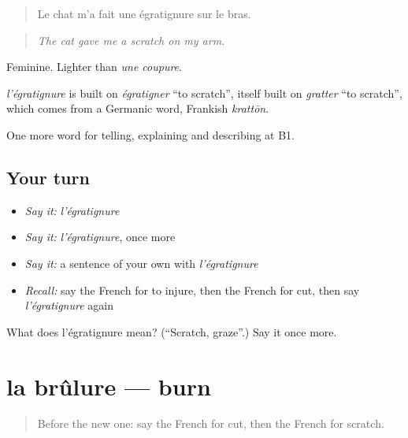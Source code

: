 \begin{quote}
Le chat m'a fait une égratignure sur le bras.
\end{quote}

\begin{quote}
\emph{The cat gave me a scratch on my arm.}
\end{quote}

Feminine. Lighter than \emph{une coupure}.

\begin{cousinweb}
\emph{l'égratignure} is built on \emph{égratigner} \textquotedblleft{}to scratch\textquotedblright{}, itself built on \emph{gratter} \textquotedblleft{}to scratch\textquotedblright{}, which comes from a Germanic word, Frankish \emph{krattōn}.
\end{cousinweb}

\begin{grammarlens}[title={What you've built}]
One more word for telling, explaining and describing at B1.
\end{grammarlens}

\subsection*{Your turn}
\begin{itemize}
\raggedright
  \item \emph{Say it:} \emph{l'égratignure}
  \item \emph{Say it:} \emph{l'égratignure}, once more
  \item \emph{Say it:} a sentence of your own with \emph{l'égratignure}
  \item \emph{Recall:} say the French for to injure, then the French for cut, then say \emph{l'égratignure} again
\end{itemize}

\begin{tcolorbox}[breakable,colback=teal!4,colframe=teal!35!black,title={Before you move on}]
What does l'égratignure mean? (\textquotedblleft{}Scratch, graze\textquotedblright{}.) Say it once more.
\end{tcolorbox}
\section[la brûlure]{la brûlure — burn}

\label{lesson:FR-C479-brulure}



\begin{quote}
Before the new one: say the French for cut, then the French for scratch.
\end{quote}

